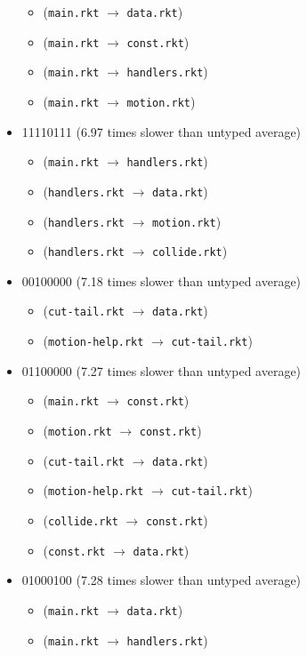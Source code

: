 \documentclass{article}
\newcommand{\mono}[1]{\texttt{#1}}
\begin{document}
\begin{itemize}
\begin{itemize}
  \item (\mono{main.rkt} $\rightarrow$ \mono{data.rkt})
  \item (\mono{main.rkt} $\rightarrow$ \mono{const.rkt})
  \item (\mono{main.rkt} $\rightarrow$ \mono{handlers.rkt})
  \item (\mono{main.rkt} $\rightarrow$ \mono{motion.rkt})
  \end{itemize}
\item 11110111 (6.97 times slower than untyped average)
  \begin{itemize}
  \item (\mono{main.rkt} $\rightarrow$ \mono{handlers.rkt})
  \item (\mono{handlers.rkt} $\rightarrow$ \mono{data.rkt})
  \item (\mono{handlers.rkt} $\rightarrow$ \mono{motion.rkt})
  \item (\mono{handlers.rkt} $\rightarrow$ \mono{collide.rkt})
  \end{itemize}
\item 00100000 (7.18 times slower than untyped average)
  \begin{itemize}
  \item (\mono{cut-tail.rkt} $\rightarrow$ \mono{data.rkt})
  \item (\mono{motion-help.rkt} $\rightarrow$ \mono{cut-tail.rkt})
  \end{itemize}
\item 01100000 (7.27 times slower than untyped average)
  \begin{itemize}
  \item (\mono{main.rkt} $\rightarrow$ \mono{const.rkt})
  \item (\mono{motion.rkt} $\rightarrow$ \mono{const.rkt})
  \item (\mono{cut-tail.rkt} $\rightarrow$ \mono{data.rkt})
  \item (\mono{motion-help.rkt} $\rightarrow$ \mono{cut-tail.rkt})
  \item (\mono{collide.rkt} $\rightarrow$ \mono{const.rkt})
  \item (\mono{const.rkt} $\rightarrow$ \mono{data.rkt})
  \end{itemize}
\item 01000100 (7.28 times slower than untyped average)
  \begin{itemize}
  \item (\mono{main.rkt} $\rightarrow$ \mono{data.rkt})
  \item (\mono{main.rkt} $\rightarrow$ \mono{handlers.rkt})

\end{itemize}
\end{itemize}
\end{document}
